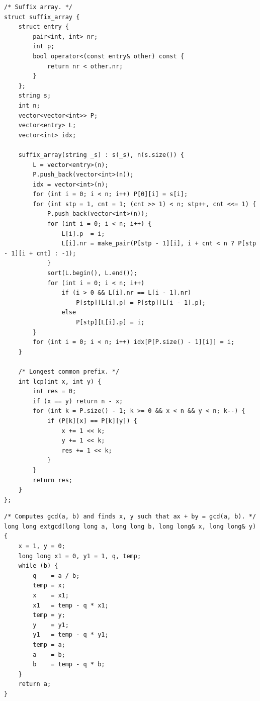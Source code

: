 \documentclass[a4paper,10pt]{article}
\newenvironment{keepfunction}{\begin{samepage}}{\end{samepage}}
\begin{document}
\begin{keepfunction}
\begin{verbatim}
/* Suffix array. */
struct suffix_array {
    struct entry {
        pair<int, int> nr;
        int p;
        bool operator<(const entry& other) const {
            return nr < other.nr;
        }
    };
    string s;
    int n;
    vector<vector<int>> P;
    vector<entry> L;
    vector<int> idx;

    suffix_array(string _s) : s(_s), n(s.size()) {
        L = vector<entry>(n);
        P.push_back(vector<int>(n));
        idx = vector<int>(n);
        for (int i = 0; i < n; i++) P[0][i] = s[i];
        for (int stp = 1, cnt = 1; (cnt >> 1) < n; stp++, cnt <<= 1) {
            P.push_back(vector<int>(n));
            for (int i = 0; i < n; i++) {
                L[i].p  = i;
                L[i].nr = make_pair(P[stp - 1][i], i + cnt < n ? P[stp - 1][i + cnt] : -1);
            }
            sort(L.begin(), L.end());
            for (int i = 0; i < n; i++)
                if (i > 0 && L[i].nr == L[i - 1].nr)
                    P[stp][L[i].p] = P[stp][L[i - 1].p];
                else
                    P[stp][L[i].p] = i;
        }
        for (int i = 0; i < n; i++) idx[P[P.size() - 1][i]] = i;
    }

    /* Longest common prefix. */
    int lcp(int x, int y) {
        int res = 0;
        if (x == y) return n - x;
        for (int k = P.size() - 1; k >= 0 && x < n && y < n; k--) {
            if (P[k][x] == P[k][y]) {
                x += 1 << k;
                y += 1 << k;
                res += 1 << k;
            }
        }
        return res;
    }
};
\end{verbatim}
\end{keepfunction}

\begin{keepfunction}
\begin{verbatim}
/* Computes gcd(a, b) and finds x, y such that ax + by = gcd(a, b). */
long long extgcd(long long a, long long b, long long& x, long long& y) {
    x = 1, y = 0;
    long long x1 = 0, y1 = 1, q, temp;
    while (b) {
        q    = a / b;
        temp = x;
        x    = x1;
        x1   = temp - q * x1;
        temp = y;
        y    = y1;
        y1   = temp - q * y1;
        temp = a;
        a    = b;
        b    = temp - q * b;
    }
    return a;
}
\end{verbatim}
\end{keepfunction}
\end{document}
